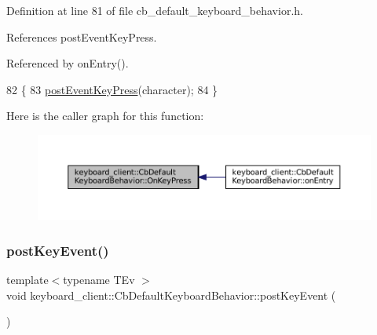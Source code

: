 Definition at line 81 of file cb\+\_\+default\+\_\+keyboard\+\_\+behavior.\+h.



References post\+Event\+Key\+Press.



Referenced by on\+Entry().


\begin{DoxyCode}
82     \{
83         \hyperlink{classkeyboard__client_1_1CbDefaultKeyboardBehavior_ac3a5e8c2cca0fd4117ddc192858d3771}{postEventKeyPress}(character);
84     \}
\end{DoxyCode}
Here is the caller graph for this function\+:
\nopagebreak
\begin{figure}[H]
\begin{center}
\leavevmode
\includegraphics[width=350pt]{classkeyboard__client_1_1CbDefaultKeyboardBehavior_ae6b6fa6b648a503f2a55eccde8556daa_icgraph}
\end{center}
\end{figure}
\mbox{\label{classkeyboard__client_1_1CbDefaultKeyboardBehavior_ae02c14e58b7348af59f3f82bfadbbbdd}} 
\subsubsection{\texorpdfstring{post\+Key\+Event()}{postKeyEvent()}}
{\footnotesize\ttfamily template$<$typename T\+Ev $>$ \\
void keyboard\+\_\+client\+::\+Cb\+Default\+Keyboard\+Behavior\+::post\+Key\+Event (\begin{DoxyParamCaption}{ }\end{DoxyParamCaption})\hspace{0.3cm}{\ttfamily [inline]}}



